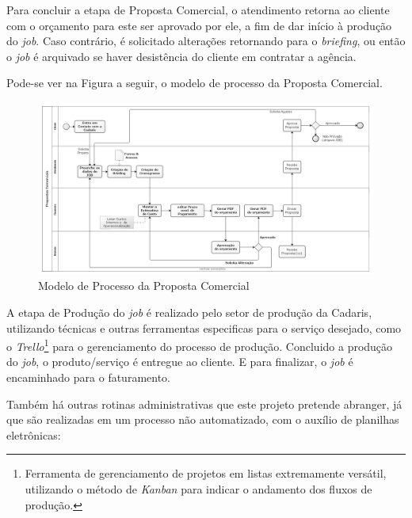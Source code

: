 \documentclass[
  12pt,            %
  openany,
  oneside,
  a4paper,         %
  english,      %
  brazil
]{article}
\numberwithin{figure}{section}
\numberwithin{table}{section}
\begin{document}
Para concluir a etapa de Proposta Comercial, o atendimento retorna ao cliente com o orçamento para este ser aprovado por ele, a fim de dar início à produção do \textit{job}. Caso contrário, é solicitado alterações retornando para o \textit{briefing}, ou então o \textit{job} é arquivado se haver desistência do cliente em contratar a agência.

Pode-se ver na Figura a seguir, o modelo de processo da Proposta Comercial.

\begin{figure}[h]
  \centering
  \includegraphics[width=\linewidth]{ModeloProcesso_Comercial_PeB}
  \caption{Modelo de Processo da Proposta Comercial}
  \label{fig:modProcess}
\end{figure}


A etapa de Produção do \textit{job} é realizado pelo setor de produção da Cadaris, utilizando técnicas e outras ferramentas especificas para o serviço desejado, como o \textit{Trello}\footnote{Ferramenta de gerenciamento de projetos em listas extremamente versátil, utilizando o método de \textit{Kanban} para indicar o andamento dos fluxos de produção.} para o gerenciamento do processo de produção. Concluido a produção do \textit{job}, o produto/serviço é entregue ao cliente. E para finalizar, o \textit{job} é encaminhado para o faturamento.

Também há outras rotinas administrativas que este projeto pretende abranger, já que são realizadas em um processo não automatizado, com o auxílio de planilhas eletrônicas:
\end{document}

